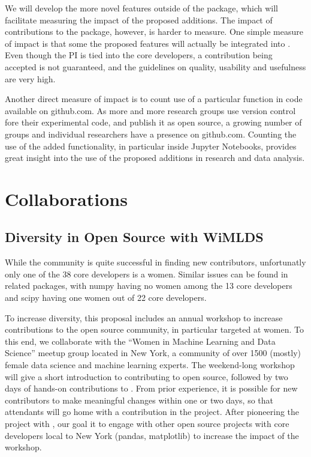 We will develop the more novel features outside of the \sklearn{} package, which will
facilitate measuring the impact of the proposed additions. The impact of contributions
to the \sklearn{} package, however, is harder to measure. One simple measure of impact
is that some the proposed features will actually be integrated into \sklearn{}.
Even though the PI is tied into the core developers, a contribution being accepted
is not guaranteed, and the guidelines on quality, usability and usefulness
are very high.

Another direct measure of impact is to count use of a particular function in
code available on github.com. As more and more research groups use version
control fore their experimental code, and publish it as open source, a growing
number of groups and individual researchers have a presence on github.com.
Counting the use of the added functionality, in particular inside Jupyter
Notebooks, provides great insight into the use of the proposed additions in
research and data analysis.


\section{Collaborations}
\subsection{Diversity in Open Source with WiMLDS}
While the \sklearn{} community is quite successful in finding new contributors,
unfortunatly only one of the 38 \sklearn{} core developers is a women.
Similar issues can be found in related packages, with numpy having no women among the 13 core
developers and scipy having one women out of 22 core developers.

To increase diversity, this proposal includes an annual workshop to increase
contributions to the open source community, in particular targeted at women.
To this end, we collaborate with the ``Women in Machine Learning and Data Science''
meetup group located in New York, a community of over 1500 (mostly) female data science and
machine learning experts.
The weekend-long workshop will give a short introduction to contributing to open source,
followed by two days of hands-on contributions to \sklearn{}.
From prior experience, it is possible for new contributors to make meaningful changes
within one or two days, so that attendants will go home with a contribution
in the project. After pioneering the project with \sklearn{}, our goal
it to engage with other open source projects with core developers local to New York
(pandas, matplotlib) to increase the impact of the workshop.

